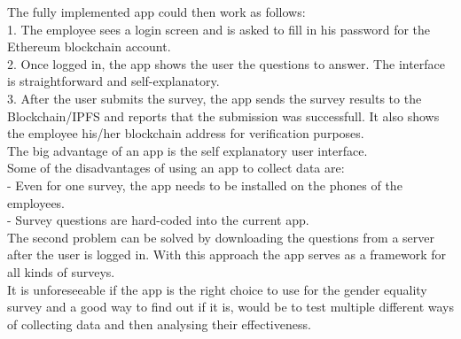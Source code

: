 
The fully implemented app could then work as follows:\\
1. The employee sees a login screen and is asked to fill in his password for the Ethereum blockchain account.\\
2. Once logged in, the app shows the user the questions to answer. The interface is straightforward and self-explanatory.\\
3. After the user submits the survey, the app sends the survey results to the Blockchain/IPFS and reports that the submission was successfull. It also shows the employee his/her blockchain address for verification purposes.\\

The big advantage of an app is the self explanatory user interface.\\

Some of the disadvantages of using an app to collect data are:\\
- Even for one survey, the app needs to be installed on the phones of the employees.\\
- Survey questions are hard-coded into the current app.\\
The second problem can be solved by downloading the questions from a server after the user is logged in. With this approach the app serves as a framework for all kinds of surveys.\\

It is unforeseeable if the app is the right choice to use for the gender equality survey and a good way to find out if it is, would be to test multiple different ways of collecting data and then analysing their effectiveness.\\